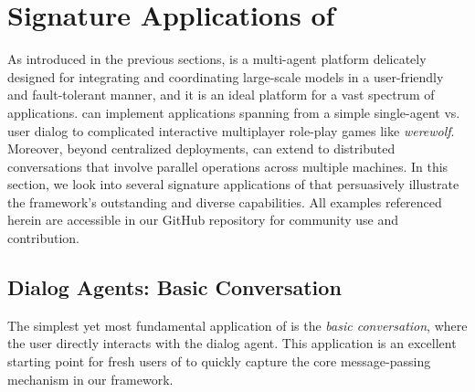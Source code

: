 \section{Signature Applications of \ours}
\label{sec:app}

As introduced in the previous sections, \ours is a multi-agent platform delicately designed for integrating and coordinating large-scale models in a user-friendly and fault-tolerant manner, and it is an ideal platform for a vast spectrum of applications. 
\ours can implement applications spanning from a simple single-agent vs. user dialog to complicated interactive multiplayer role-play games like \textit{werewolf}. 
Moreover, beyond centralized deployments, \ours can extend to distributed conversations that involve parallel operations across multiple machines. In this section, we look into several signature applications of \ours that persuasively illustrate the framework's outstanding and diverse capabilities. All examples referenced herein are accessible in our GitHub repository for community use and contribution.


\subsection{Dialog Agents: Basic Conversation}

The simplest yet most fundamental application of \ours is the \textit{basic conversation}, where the user directly interacts with the dialog agent. This application is an excellent starting point for fresh users of \ours to quickly capture the core message-passing mechanism in our framework.

